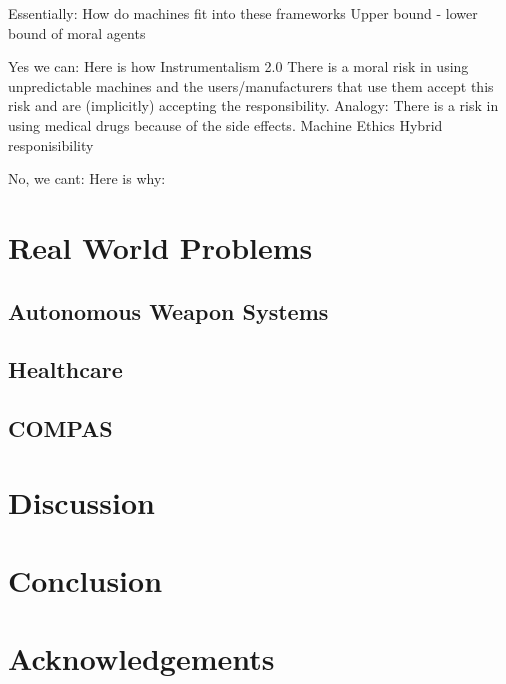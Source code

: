 \documentclass{article}
\begin{document}
Essentially: How do machines fit into these frameworks
Upper bound - lower bound of moral agents

Yes we can: Here is how
Instrumentalism 2.0
	There is a moral risk in using unpredictable machines and the
	users/manufacturers that use them accept this risk and are (implicitly)
	accepting the responsibility. Analogy: There is a risk in using medical
	drugs because of the side effects.
Machine Ethics
Hybrid responisibility

No, we cant: Here is why:

\section{Real World Problems}
\subsection{Autonomous Weapon Systems}
\subsection{Healthcare}
\subsection{COMPAS}
\section{Discussion}
\section{Conclusion}
\section{Acknowledgements}
\clearpage

\printglossary[type=\acronymtype]
\printglossary
\printbibliography
\end{document}
